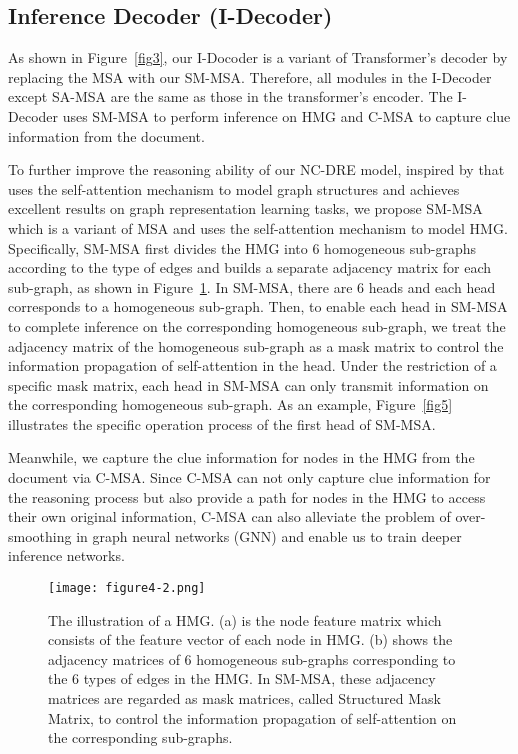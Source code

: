 \documentclass[sigconf,natbib=true]{acmart}
\begin{document}
\subsection{Inference Decoder (I-Decoder)}
\label{sec2.2}
As shown in Figure~\ref{fig3}, our I-Docoder is a variant of Transformer's decoder by replacing the MSA with our SM-MSA.
Therefore, all modules in the I-Decoder except SA-MSA are the same as those in the transformer's encoder.
The I-Decoder uses SM-MSA to perform inference on HMG and C-MSA to capture clue information from the document.

To further improve the reasoning ability of our NC-DRE model, inspired by \cite{c:1} that uses the self-attention mechanism to model graph structures and achieves excellent results on graph representation learning tasks, we propose SM-MSA which is a variant of MSA and uses the self-attention mechanism to model HMG.
Specifically, SM-MSA first divides the HMG into 6 homogeneous sub-graphs according to the type of edges and builds a separate adjacency matrix for each sub-graph, as shown in Figure~\ref{fig4}.
In SM-MSA, there are 6 heads and each head corresponds to a homogeneous sub-graph.
Then, to enable each head in SM-MSA to complete inference on the corresponding homogeneous sub-graph, we treat the adjacency matrix of the homogeneous sub-graph as a mask matrix to control the information propagation of self-attention in the head.
Under the restriction of a specific mask matrix, each head in SM-MSA can only transmit information on the corresponding homogeneous sub-graph.
As an example, Figure~\ref{fig5} illustrates the specific operation process of the first head of SM-MSA.

Meanwhile, we capture the clue information for nodes in the HMG from the document via C-MSA.
Since C-MSA can not only capture clue information for the reasoning process but also provide a path for nodes in the HMG to access their own original information, C-MSA can also alleviate the problem of over-smoothing \cite{c:5,c:6,c:7} in graph neural networks (GNN) and enable us to train deeper inference networks.

\begin{figure}[t]
\centering
\texttt{[image: figure4-2.png]} %
\caption{
The illustration of a HMG.
(a) is the node feature matrix which consists of the feature vector of each node in HMG.
(b) shows the adjacency matrices of 6 homogeneous sub-graphs corresponding to the 6 types of edges in the HMG.
In SM-MSA, these adjacency matrices are regarded as mask matrices, called Structured Mask Matrix, to control the information propagation of self-attention on the corresponding sub-graphs.
}
\label{fig4}
\end{figure}
\end{document}
